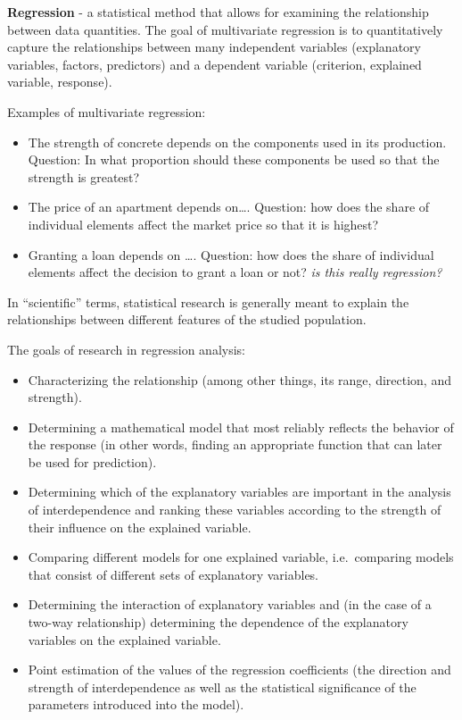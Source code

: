 \documentclass[
  english,
  letterpaper,
  DIV=11,
  numbers=noendperiod]{scrreprt}
\providecommand{\tightlist}{%
  \setlength{\itemsep}{0pt}\setlength{\parskip}{0pt}}
\begin{document}
\textbf{Regression} - a statistical method that allows for examining the
relationship between data quantities. The goal of multivariate
regression is to quantitatively capture the relationships between many
independent variables (explanatory variables, factors, predictors) and a
dependent variable (criterion, explained variable, response).

Examples of multivariate regression:

\begin{itemize}
\item
  The strength of concrete depends on the components used in its
  production. Question: In what proportion should these components be
  used so that the strength is greatest?
\item
  The price of an apartment depends on\ldots. Question: how does the
  share of individual elements affect the market price so that it is
  highest?
\item
  Granting a loan depends on \ldots. Question: how does the share of
  individual elements affect the decision to grant a loan or not?
  \emph{is this really regression?}
\end{itemize}

In ``scientific'' terms, statistical research is generally meant to
explain the relationships between different features of the studied
population.

The goals of research in regression analysis:

\begin{itemize}
\tightlist
\item
  Characterizing the relationship (among other things, its range,
  direction, and strength).
\item
  Determining a mathematical model that most reliably reflects the
  behavior of the response (in other words, finding an appropriate
  function that can later be used for prediction).
\item
  Determining which of the explanatory variables are important in the
  analysis of interdependence and ranking these variables according to
  the strength of their influence on the explained variable.
\item
  Comparing different models for one explained variable, i.e.~comparing
  models that consist of different sets of explanatory variables.
\item
  Determining the interaction of explanatory variables and (in the case
  of a two-way relationship) determining the dependence of the
  explanatory variables on the explained variable.
\item
  Point estimation of the values of the regression coefficients (the
  direction and strength of interdependence as well as the statistical
  significance of the parameters introduced into the model).
\end{itemize}
\end{document}

